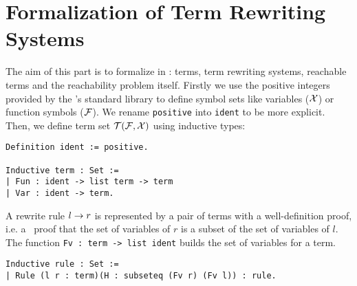 \section{Formalization of Term Rewriting Systems}
\label{sec:rewriting}

The aim of this part is to formalize in \coq: terms, term rewriting systems,
reachable terms and the reachability problem itself.  Firstly we use the
positive integers provided by the \coq's standard library to define symbol sets
like variables (${\cal X}$) or function symbols ($\mathcal{F}$). We rename \lstinline!positive! into
\lstinline!ident! to be more explicit. Then, we define term set ${\cal T(F, X)}$ using inductive
types:

\switchlstcoq
\begin{lstlisting}
Definition ident := positive.

Inductive term : Set :=
| Fun : ident -> list term -> term
| Var : ident -> term.
\end{lstlisting}



A rewrite rule $l \rightarrow r$ is represented by a pair of terms with a
well-definition proof, i.e. a \coq\ proof that the set of variables of $r$ is a
subset of the set of variables of $l$. The function
\lstinline!Fv : term -> list ident! builds the set of variables for a term. 
\begin{lstlisting}
Inductive rule : Set :=
| Rule (l r : term)(H : subseteq (Fv r) (Fv l)) : rule.
\end{lstlisting}

